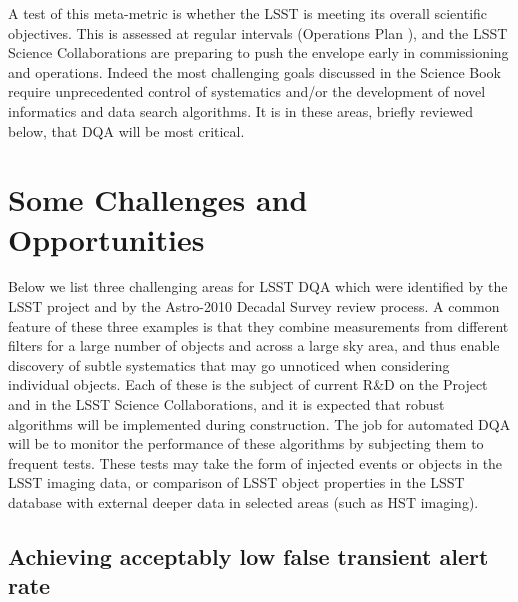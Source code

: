 \documentclass[SE,toc,lsstdraft]{lsstdoc}
\begin{document}
A test of this meta-metric is whether the LSST is meeting its overall scientific objectives.  This is assessed at regular intervals (Operations Plan ), and the LSST Science Collaborations are preparing to push the envelope early in commissioning and operations. Indeed the most challenging goals discussed in the Science Book require unprecedented control of systematics and/or the development of novel informatics and data search algorithms. It is in these areas, briefly reviewed below,  that DQA will be most critical.



\section{Some Challenges and Opportunities}

Below we list three challenging areas for LSST DQA which were identified by the LSST project and by the Astro-2010 Decadal Survey review process. A common feature of these three examples is that they combine measurements from different filters for a large number of objects and across a large sky area, and thus enable discovery of subtle systematics that may go unnoticed when considering individual objects. Each of these is the subject of current R\&D on the Project and in the LSST Science Collaborations, and it is expected that robust algorithms will be implemented during construction.  The job for automated DQA will be to monitor the performance of these algorithms by subjecting them to frequent tests. These tests may take the form of injected events or objects in the LSST imaging data, or comparison of LSST object properties in the LSST database with external deeper data in selected areas (such as HST imaging).

\subsection{Achieving acceptably low false transient alert rate}
\end{document}
